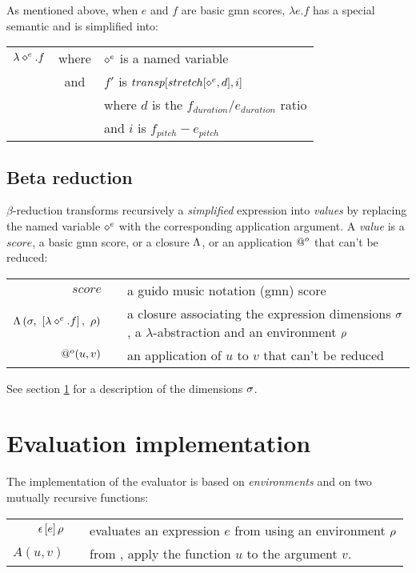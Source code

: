 \documentclass[10pt,a4paper,frenchb]{article}
\begin{document}
As mentioned above, when $e$ and $f$ are basic gmn scores, $\lambda e.f$ has a special semantic and is simplified into: 
\begin{tabular}{rcl}
 $\lambda \diamond^e.f$ & where & $\diamond^e$ is a named variable \\
 	& and & $f'$ is $transp[stretch[\diamond^e, d], i]$ \\
 	&  & where $d$ is the $f_{duration} / e_{duration}$ ratio \\
 	&  & and $i$ is $f_{pitch} - e_{pitch}$ \\
\end{tabular}


\subsection{Beta reduction}

$\beta$-reduction transforms recursively a \emph{simplified} expression into \emph{values} by replacing the named variable $\diamond^e$ with the corresponding application argument. A \emph{value} is a $score$, a basic gmn score, or a closure $\Lambda$, or an application $@^o$ that can't be reduced:
\begin{center}
\begin{tabular}{rc@{ : }l}
 $score$				& & a guido music notation (gmn) score \\
 $\Lambda\left(\sigma,\ \left[\lambda \diamond^e.f\right],\ \rho \right)$  & & a closure associating the expression dimensions $\sigma$, a $\lambda$-abstraction and an environment $\rho$ \\
 $@^o(u,v)$ 		& & an application of $u$ to $v$ that can't be reduced \\
\end{tabular}
\end{center}

See section \ref{impl} for a description of the dimensions $\sigma$.

\section{Evaluation implementation}
\label{impl}

The implementation of the evaluator is based on \emph{environments} and on two mutually recursive functions:
\begin{center}
\begin{tabular}{rc@{ : }l}
$\epsilon\left[e\right]\rho$ & & evaluates an expression $e$ from \sdomain{\expr}{\env}{\val} using an environment $\rho$ \\
$A(u,v)$  & & from \sdomain{\val}{\val}{\val}, apply the function $u$ to the argument $v$. \\
\end{tabular}
\end{center}
\end{document}
